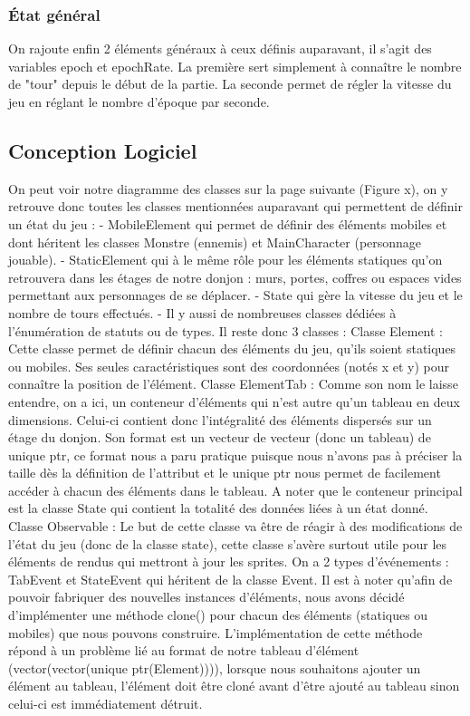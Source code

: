 \documentclass[a4paper,12pt]{article}
\begin{document}
\subsubsection{État général}

On rajoute enfin 2 éléments généraux à ceux définis auparavant, il s'agit des variables epoch et epochRate.
La première sert simplement à connaître le nombre de "tour" depuis le début de la partie. 
La seconde permet de régler la vitesse du jeu en réglant le nombre d'époque par seconde.

\subsection{Conception Logiciel}

On peut voir notre diagramme des classes sur la page suivante (Figure x), on y retrouve donc toutes les classes mentionnées auparavant qui permettent de définir un état du jeu :
- MobileElement qui permet de définir des éléments mobiles et dont héritent les classes Monstre (ennemis) et MainCharacter (personnage jouable).
- StaticElement qui à le même rôle pour les éléments statiques qu'on retrouvera dans les étages de notre donjon : murs, portes, coffres ou espaces vides permettant aux personnages de se déplacer.
- State qui gère la vitesse du jeu et le nombre de tours effectués.
- Il y aussi de nombreuses classes dédiées à l'énumération de statuts ou de types.
\bigbreak
Il reste donc 3 classes : 
\bigbreak
Classe Element : Cette classe permet de définir chacun des éléments du jeu, qu'ils soient statiques ou mobiles. Ses seules caractéristiques sont des coordonnées (notés x et y) pour connaître la position de l'élément.
\bigbreak
Classe ElementTab :  Comme son nom le laisse entendre, on a ici, un conteneur d'éléments qui n'est autre qu'un tableau en deux dimensions. Celui-ci contient donc l'intégralité des éléments dispersés sur un étage du donjon.
Son format est un vecteur de vecteur (donc un tableau) de unique ptr, ce format nous a paru pratique puisque nous n'avons pas à préciser la taille dès la définition de l'attribut et le unique ptr nous permet de facilement accéder à chacun des éléments dans le tableau.
A noter que le conteneur principal est la classe State qui contient la totalité des données liées à un état donné.
\bigbreak
Classe Observable : Le but de cette classe va être de réagir à des modifications de l'état du jeu (donc de la classe state), cette classe s'avère surtout utile pour les éléments de rendus qui mettront à jour les sprites. On a 2 types d'événements : TabEvent et StateEvent qui héritent de la classe Event.
\bigbreak
Il est à noter qu'afin de pouvoir fabriquer des nouvelles instances d'éléments, nous avons décidé d'implémenter une méthode clone() pour chacun des éléments (statiques ou mobiles) que nous pouvons construire. 
L'implémentation de cette méthode répond à un problème lié au format de notre tableau d'élément (vector(vector(unique ptr(Element)))), lorsque nous souhaitons ajouter un élément au tableau, l'élément doit être cloné avant d'être ajouté au tableau sinon celui-ci est immédiatement détruit.
\end{document}
